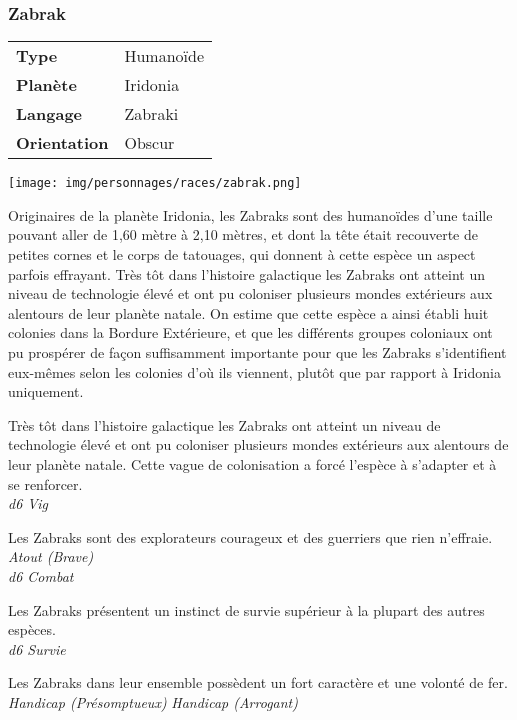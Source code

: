 \subsubsection{Zabrak}
\begin{samepage}
	\begin{flushright}
		\begin{tabular}{ l l }
			\textbf{Type} 			& Humanoïde \\
		   	\textbf{Planète} 		& Iridonia \\
		   	\textbf{Langage} 		& Zabraki \\
		   	\textbf{Orientation} 	& Obscur \\
		\end{tabular}
	\end{flushright}
	\vspace{-6\baselineskip}
	\texttt{[image: img/personnages/races/zabrak.png]}
\end{samepage}

Originaires de la planète Iridonia, les Zabraks sont des humanoïdes d’une taille pouvant aller de 1,60 mètre à 2,10 mètres, et dont la tête était recouverte de petites cornes et le corps de tatouages, qui donnent à cette espèce un aspect parfois effrayant. Très tôt dans l’histoire galactique les Zabraks ont atteint un niveau de technologie élevé et ont pu coloniser plusieurs mondes extérieurs aux alentours de leur planète natale. On estime que cette espèce a ainsi établi huit colonies dans la Bordure Extérieure, et que les différents groupes coloniaux ont pu prospérer de façon suffisamment importante pour que les Zabraks s’identifient eux-mêmes selon les colonies d’où ils viennent, plutôt que par rapport à Iridonia uniquement.

\begin{description}[align=left]
	\item [Endurance] 				%
		Très tôt dans l’histoire galactique les Zabraks ont atteint un niveau de technologie élevé et ont pu coloniser plusieurs mondes extérieurs aux alentours de leur planète natale. Cette vague de colonisation a forcé l’espèce à s’adapter et à se renforcer.\\
		\textit{d6 Vig}

	\item [Braveheart] 				%
		Les Zabraks sont des explorateurs courageux et des guerriers que rien n’effraie.\\
		\textit{Atout (Brave)}\\
		\textit{d6 Combat}

	\item [Survivor] 				%
		Les Zabraks présentent un instinct de survie supérieur à la plupart des autres espèces.\\
		\textit{d6 Survie}

	\item [Fierté mal placé] 				%
		Les Zabraks dans leur ensemble possèdent un fort caractère et une volonté de fer.\\
		\textit{Handicap (Présomptueux)}
		\textit{Handicap (Arrogant)}
\end{description}